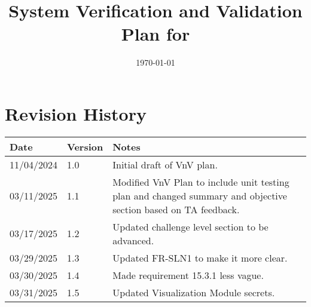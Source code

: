 \documentclass[12pt, titlepage]{article}
\begin{document}
\title{System Verification and Validation Plan for \progname{}} 
\author{\authname}
\date{\today}
	
\maketitle


\section*{Revision History}

\begin{tabularx}{\textwidth}{p{3cm}p{2cm}X}
\toprule {\bf Date} & {\bf Version} & {\bf Notes}\\
\midrule
11/04/2024 & 1.0 & Initial draft of VnV plan.\\
03/11/2025 & 1.1 & Modified VnV Plan to include unit testing plan and changed summary and objective section based on TA feedback. \\
03/17/2025 & 1.2 & Updated challenge level section to be advanced. \\
03/29/2025 & 1.3 & Updated FR-SLN1 to make it more clear. \\
03/30/2025 & 1.4 & Made requirement 15.3.1 less vague.\\
03/31/2025 & 1.5 & Updated Visualization Module secrets. \\
\bottomrule
\end{tabularx}

~\\

\end{document}
